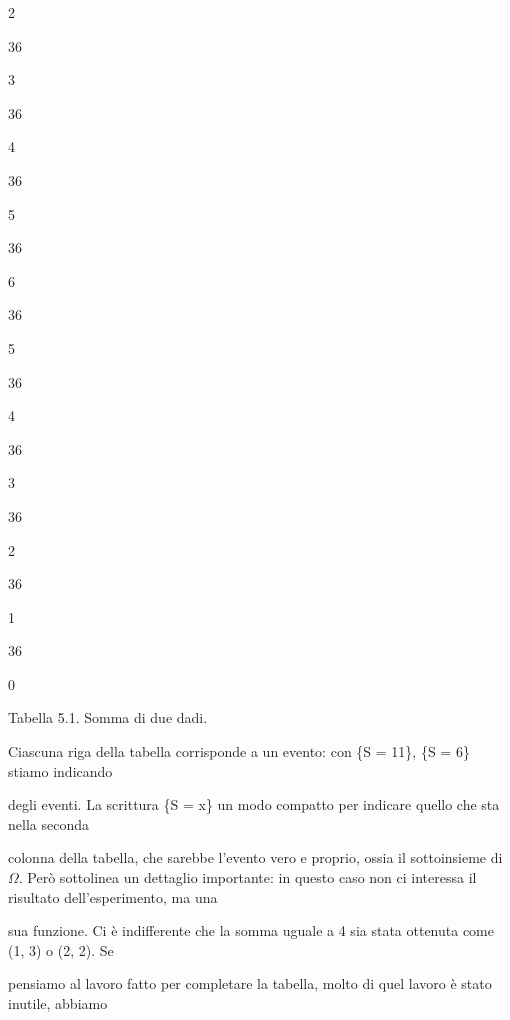 \documentclass[a4paper,portrait,12pt]{article}
\begin{document}
2


36


3


36


4


36


5


36


6


36


5


36


4


36


3


36


2


36


1


36





0





\begin{flushleft}
Tabella 5.1. Somma di due dadi.
\end{flushleft}





\begin{flushleft}
Ciascuna riga della tabella corrisponde a un evento: con \{S = 11\}, \{S = 6\} stiamo indicando
\end{flushleft}


\begin{flushleft}
degli eventi. La scrittura \{S = x\} un modo compatto per indicare quello che sta nella seconda
\end{flushleft}


\begin{flushleft}
colonna della tabella, che sarebbe l'evento vero e proprio, ossia il sottoinsieme di $\Omega$. Per\`{o} sottolinea un dettaglio importante: in questo caso non ci interessa il risultato dell'esperimento, ma una
\end{flushleft}


\begin{flushleft}
sua funzione. Ci \`{e} indifferente che la somma uguale a 4 sia stata ottenuta come (1, 3) o (2, 2). Se
\end{flushleft}


\begin{flushleft}
pensiamo al lavoro fatto per completare la tabella, molto di quel lavoro \`{e} stato inutile, abbiamo
\end{flushleft}
\end{document}
